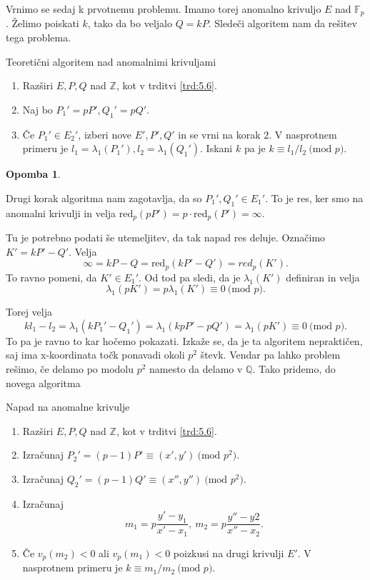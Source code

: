 \documentclass[12pt,a4paper,twoside]{article}
\theoremstyle{definition} %
\newtheorem{opomba}[definicija]{Opomba}
\theoremstyle{plain} %
\numberwithin{equation}{section}  %
\newcommand{\Z}{\mathbb Z}
\newcommand{\Q}{\mathbb Q}
\newcommand{\F}{\mathbb F}
\newcommand{\MOD}[1]{\ \text{(mod }{#1}\text{)}}
\begin{document}
Vrnimo se sedaj k prvotnemu problemu. Imamo torej anomalno krivuljo $E$ nad $\F_p$. Želimo poiskati $k$, tako da bo veljalo $Q = kP$. Sledeči algoritem nam da rešitev tega problema.

\begin{algorithm}[H]
\caption[AN]{Teoretični algoritem nad anomalnimi krivuljami}
\label{alg:Anomal}
\begin{enumerate}
\item Razširi $E,P,Q$ nad $\Z$, kot v trditvi \ref{trd:5.6}.
\item Naj bo $P_1' = pP',Q_1' = pQ'$.
\item Če $P_1' \in E_2'$, izberi nove $E',P',Q'$ in se vrni na korak $2$. V nasprotnem primeru je $l_1 = \lambda_1(P_1'),l_2 = \lambda_1(Q_1')$. Iskani $k$ pa je $k \equiv l_1/l_2 \MOD{p}$.
\end{enumerate}

\end{algorithm}

\begin{opomba}~

Drugi korak algoritma nam zagotavlja, da so $P_1',Q_1' \in E_1'$. To je res, ker smo na anomalni krivulji in velja $\text{red}_p(pP') = p\cdot \text{red}_p(P') = \infty$.
\end{opomba}

Tu je potrebno podati še utemeljitev, da tak napad res deluje. Označimo $K' = kP'-Q'$.
Velja
$$\infty = kP-Q = \text{red}_p(kP'-Q') = red_p(K').$$
To ravno pomeni, da $K' \in E_1'$. Od tod pa sledi, da je $\lambda_1(K')$ definiran in velja
$$\lambda_1(pK') = p \lambda_1(K') \equiv 0 \MOD{p}.$$

Torej velja
$$kl_1-l_2 = \lambda_1(kP_1'-Q_1') = \lambda_1(kpP'-pQ') = \lambda_1(pK') \equiv 0 \MOD{p}.$$
To pa je ravno to kar hočemo pokazati.
Izkaže se, da je ta algoritem nepraktičen, saj ima x-koordinata točk ponavadi okoli $p^2$ števk.
Vendar pa lahko problem rešimo, če delamo po modolu $p^2$ namesto da delamo v $\Q$.
Tako pridemo, do novega algoritma

\begin{algorithm}[H]
\caption[ANC]{Napad na anomalne krivulje}
\label{alg:AnomalAttack}
\begin{enumerate}
\item Razširi $E,P,Q$ nad $\Z$, kot v trditvi \ref{trd:5.6}.
\item Izračunaj $P_2' = (p-1)P' \equiv (x',y') \MOD{p^2}$.
\item Izračunaj $Q_2' = (p-1)Q' \equiv(x'',y'') \MOD{p^2}$.
\item Izračunaj
$$m_1 = p\frac{y'-y_1}{x'-x_1}, \ m_2 = p\frac{y''-y2}{x''-x_2}.$$
\item Če $v_p(m_2) <0$ ali $v_p(m_1)<0$ poizkusi na drugi krivulji $E'$. V nasprotnem primeru je $k \equiv m_1/m_2 \MOD{p}$.
\end{enumerate}

\end{algorithm}
\end{document}
